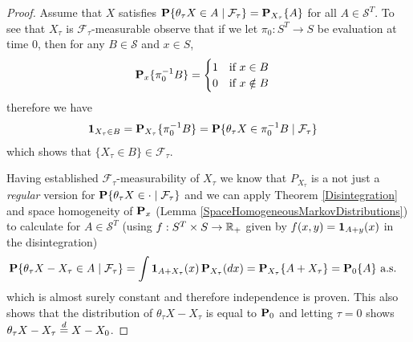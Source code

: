 \begin{proof}
Assume that $X$ satisfies $\cprobability{\mathcal{F}_\tau}{\theta_\tau
  X \in A} = \sprobability{A}{X_\tau}$ for all $A \in \mathcal{S}^T$.  To see that $X_\tau$ is
$\mathcal{F}_\tau$-measurable observe that if we let $\pi_0 : S^T \to
S$ be
evaluation at time $0$, then for any $B \in \mathcal{S}$ and $x \in S$,
\begin{align*}
\sprobability{\pi_0^{-1}B}{x} &= \begin{cases}
1 & \text{if $x \in B$} \\
0 & \text{if $x \notin B$}
\end{cases}
\end{align*}
therefore we have
\begin{align*}
\characteristic{X_\tau \in B} &=
\sprobability{\pi_0^{-1}B}{X_\tau} =
\cprobability{\mathcal{F}_\tau}{\theta_\tau X \in \pi_0^{-1} B}
\end{align*}
which shows that $\lbrace X_\tau \in B \rbrace \in \mathcal{F}_\tau$.

Having established $\mathcal{F}_\tau$-measurability of $X_\tau$ we
know that $P_{X_\tau}$ is a not just a \emph{regular} version for
$\cprobability{\mathcal{F}_\tau}{\theta_\tau X \in \cdot}$ and we can
apply Theorem \ref{Disintegration} and space homogeneity of
$\probabilityop_x$ (Lemma \ref{SpaceHomogeneousMarkovDistributions})
to calculate for $A \in \mathcal{S}^T$ (using $f: S^T \times S \to
\reals_+$ given by $f(x,y) = \characteristic{A+y}(x)$ in the disintegration) 
\begin{align*}
\cprobability{\mathcal{F}_\tau}{\theta_\tau X - X_\tau \in A} &= 
\int \characteristic{A + X_\tau} (x) \,
\probabilityop_{X_\tau}(dx) 
=\sprobability{A + X_\tau}{X_\tau}
=\sprobability{A}{0} \text{ a.s.}
\end{align*}
which is almost surely constant and therefore independence is proven.
This also shows that the distribution of $\theta_\tau X - X_\tau$ is
equal to $\probabilityop_0$ and letting $\tau = 0$ shows $\theta_\tau
X - X_\tau \eqdist X - X_0$.


\end{proof}
